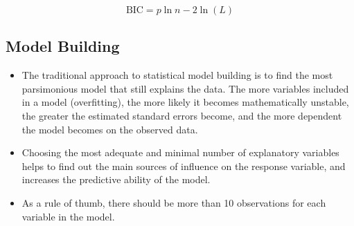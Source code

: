 \documentclass[a4paper,12pt]{article}
\begin{document}
\[\mbox{BIC} = p\ln{n} - 2\ln(L)\]



%
%
%
%




\subsection*{Model Building}
\begin{itemize}
	\item The traditional approach to statistical model building is to find the most parsimonious model that still explains the data. The more variables included in a model (overfitting), the more likely it becomes mathematically unstable, the greater the estimated standard errors become, and the more dependent the model becomes on the observed data. \item Choosing the most adequate and minimal number of explanatory variables helps to find out the main sources of influence on the response variable, and increases the predictive ability of the model. 
	\item As a rule of thumb, there should be more than 10 observations for each variable in the model.
\end{itemize}
\end{document}
